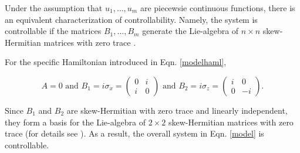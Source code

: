 \documentclass[{../RL_for_QSP.tex}]{subfiles}
\begin{document}
Under the assumption that $u_1, \hdots, u_m$ are piecewsie continuous functions, there is an equivalent characterization of controllability. Namely, the system is controllable if the matrices $B_1, \hdots, B_m$ generate the Lie-algebra of $n \times n$ skew-Hermitian matrices with zero trace \cite{d2007introduction}. 

For the specific Hamiltonian introduced in Eqn. \ref{modelhaml}, 

$$A = 0 \text{ and } B_1 = i \sigma_x = \begin{pmatrix} 0 & i \\ i & 0\end{pmatrix} \text{ and } B_2 = i \sigma_z = \begin{pmatrix} i & 0 \\ 0 & -i\end{pmatrix}.$$

Since $B_1$ and $B_2$ are skew-Hermitian with zero trace and linearly independent, they form a basis for the Lie-algebra of $2 \times 2$ skew-Hermitian matrices with zero trace (for details see \cite{aless2010topo}). As a result, the overall system in Eqn. \ref{model} is controllable.



\end{document}

